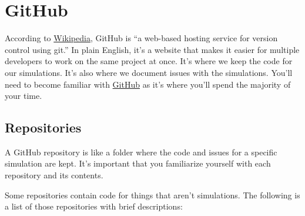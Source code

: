 \documentclass[titlepage]{article}
\begin{document}
\pagebreak


\section{GitHub}

According to \href{https://en.wikipedia.org/wiki/GitHub}{Wikipedia}, GitHub is ``a web-based hosting service for version control using git.'' In plain English, it's a website that makes it easier for multiple developers to work on the same project at once. It's where we keep the code for our simulations. It's also where we document issues with the simulations. You'll need to become familiar with \href{https://github.com/phetsims}{GitHub} as it's where you'll spend the majority of your time.

	\subsection{Repositories}

A GitHub repository is like a folder where the code and issues for a specific simulation are kept. It's important that you familiarize yourself with each repository and its contents.

Some repositories contain code for things that aren't simulations. The following is a list of those repositories with brief descriptions:
\end{document}
